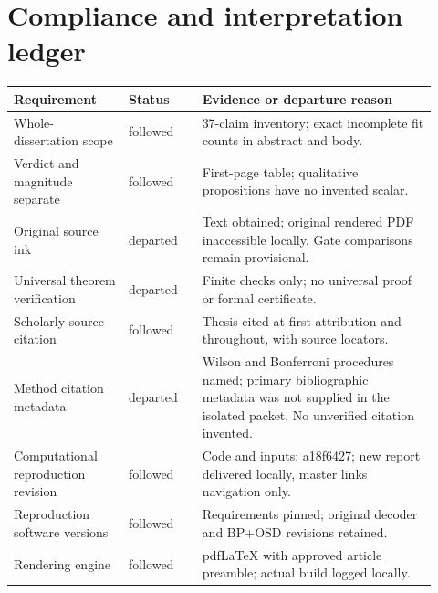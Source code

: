 \documentclass[11pt]{article}
\begin{document}
\section{Compliance and interpretation ledger}
\begin{longtable}{p{0.25\linewidth}p{0.16\linewidth}p{0.51\linewidth}}
\toprule Requirement & Status & Evidence or departure reason\\\midrule
Whole-dissertation scope & followed & 37-claim inventory; exact incomplete fit counts in abstract and body.\\
Verdict and magnitude separate & followed & First-page table; qualitative propositions have no invented scalar.\\
Original source ink & departed & Text obtained; original rendered PDF inaccessible locally. Gate comparisons remain provisional.\\
Universal theorem verification & departed & Finite checks only; no universal proof or formal certificate.\\
Scholarly source citation & followed & Thesis cited at first attribution and throughout, with source locators.\\
Method citation metadata & departed & Wilson and Bonferroni procedures named; primary bibliographic metadata was not supplied in the isolated packet. No unverified citation invented.\\
Computational reproduction revision & followed & Code and inputs: a18f6427; new report delivered locally, master links navigation only.\\
Reproduction software versions & followed & Requirements pinned; original decoder and BP+OSD revisions retained.\\
Rendering engine & followed & pdfLaTeX with approved article preamble; actual build logged locally.\\
\bottomrule\end{longtable}

\end{document}
